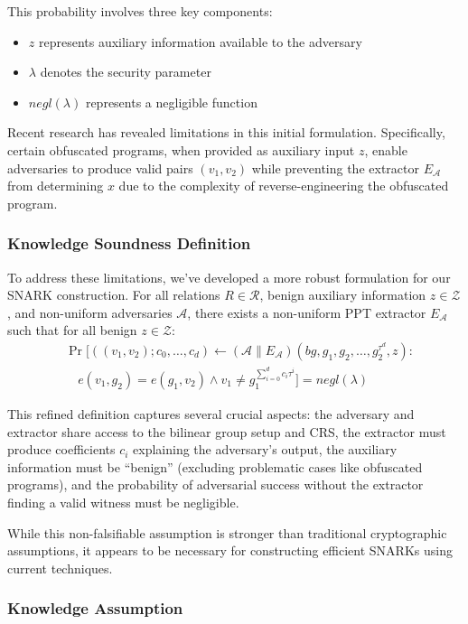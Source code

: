 This probability involves three key components:
\begin{itemize}
    \item $z$ represents auxiliary information available to the adversary
    \item $\lambda$ denotes the security parameter
    \item $negl(\lambda)$ represents a negligible function
\end{itemize}

Recent research has revealed limitations in this initial formulation. Specifically, certain obfuscated programs, when provided as auxiliary input $z$, enable adversaries to produce valid pairs $(v_1, v_2)$ while preventing the extractor $E_\mathcal{A}$ from determining $x$ due to the complexity of reverse-engineering the obfuscated program.

\subsubsection{Knowledge Soundness Definition}

To address these limitations, we've developed a more robust formulation for our SNARK construction. For all relations $R \in \mathcal{R}$, benign auxiliary information $z \in \mathcal{Z}$, and non-uniform adversaries $\mathcal{A}$, there exists a non-uniform PPT extractor $E_\mathcal{A}$ such that for all benign $z \in \mathcal{Z}$:
\[ \begin{aligned}
&\Pr[((v_1, v_2); c_0, \dots, c_d) \gets (\mathcal{A} \| E_\mathcal{A})(bg, g_1, g_2, \dots, g_2^{\tau^d}, z) : \\
&\quad e(v_1, g_2) = e(g_1, v_2) \land v_1 \neq g_1^{\sum_{i=0}^d c_i \tau^i}] = negl(\lambda)
\end{aligned} \]

This refined definition captures several crucial aspects: the adversary and extractor share access to the bilinear group setup and CRS, the extractor must produce coefficients $c_i$ explaining the adversary's output, the auxiliary information must be ``benign'' (excluding problematic cases like obfuscated programs), and the probability of adversarial success without the extractor finding a valid witness must be negligible.

While this non-falsifiable assumption is stronger than traditional cryptographic assumptions, it appears to be necessary for constructing efficient SNARKs using current techniques.

\subsubsection{Knowledge Assumption}

